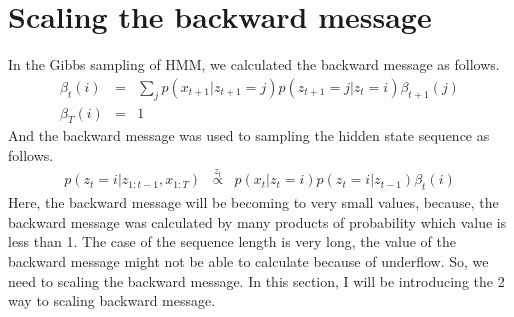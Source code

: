 \documentclass[a4paper]{article}
\newcommand{\proptoas}[1]{\overset{#1}{\propto}}
\begin{document}
	\section{Scaling the backward message}
	In the Gibbs sampling of HMM, we calculated the backward message as follows.
	\begin{eqnarray}
		\beta_t(i) &=& \sum_{j}{p(x_{t+1} | z_{t+1} = j) p(z_{t+1} = j | z_{t} = i) \beta_{t+1}(j)} \\
		\beta_T(i) &=& 1
	\end{eqnarray}
	And the backward message was used to sampling the hidden state sequence as follows.
	\begin{eqnarray}
		p(z_{t} = i | z_{1:t-1}, x_{1:T})
		&\proptoas{z_t}&
		p(x_t | z_t = i) p(z_t = i | z_{t-1}) \beta_t(i)
	\end{eqnarray}
	Here, the backward message will be becoming to very small values, because, the backward message was calculated by many products of probability which value is less than 1.
	The case of the sequence length is very long, the value of the backward message might not be able to calculate because of underflow.
	So, we need to scaling the backward message.
	In this section, I will be introducing the 2 way to scaling backward message.
\end{document}
